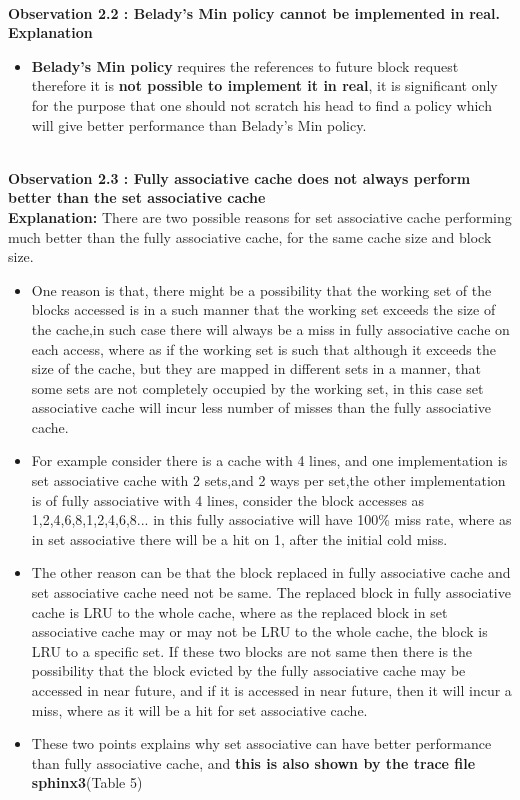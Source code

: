 \documentclass[]{article}
\begin{document}
\pagebreak
\textbf{\\Observation 2.2 : Belady's Min policy cannot be implemented in real.}
\textbf{\\Explanation}
\begin{itemize}
    \item  \textbf{Belady's Min policy} requires the references to future block request therefore it is \textbf{not possible to implement it in real}, it is significant only for the purpose that one should not scratch his head to find a policy which will give better performance than Belady's Min policy. 
  \end{itemize}
 \textbf{\\Observation 2.3 : Fully associative cache does not always perform better than the set associative cache}
 \textbf{\\Explanation:}
 There are two possible reasons for set associative cache performing much better than the fully associative cache, for the same cache size and block size.
 \begin{itemize}
     \item One reason is that, there might be a possibility that the working set of the blocks accessed is in a such manner that the working set exceeds the size of the cache,in such case there will always be a miss in fully associative cache on each access, where as if the working set is such that although it exceeds the size of the cache, but they are mapped in different sets in a manner, that some sets are not completely occupied by the working set, in this case set associative cache will incur less number of misses than the fully associative cache.
     \item For example consider there is a cache with 4 lines, and one implementation is set associative cache with 2 sets,and 2 ways per set,the other implementation is of fully associative with 4 lines, consider the block accesses as 1,2,4,6,8,1,2,4,6,8... in this fully associative will have 100\% miss rate, where as in set associative there will be a hit on 1, after the initial cold miss. 
    \smallskip
     \item The other reason can be that the block replaced in fully associative cache and set associative cache need not be same. The replaced block in fully associative cache is LRU to the whole cache, where as the replaced block in set associative cache may or may not be LRU to the whole cache, the block is LRU to a specific set. If these two blocks are not same then there is the possibility that the block evicted by the fully associative cache may be accessed in near future, and if it is accessed in near future, then it will incur a miss, where as it will be a hit for set associative cache.
     \smallskip
     \item These two points explains why set associative can have better performance than fully associative cache, and \textbf{this is also shown by the trace file sphinx3}(Table 5)
     
 \end{itemize}
 
\end{document}
